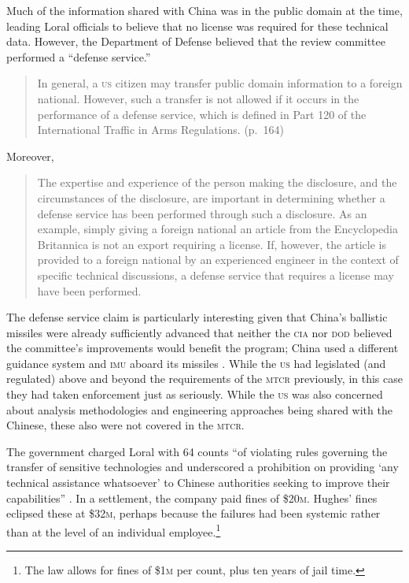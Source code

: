 \documentclass[preprint,twocolumn,5p]{elsarticle}
\begin{document}
Much of the information shared with China was in the public domain at the time, leading Loral officials to believe that no license was required for these technical data. However, the Department of Defense believed that the review committee performed a ``defense service.''
\begin{quote}
In general, a \textsc{us} citizen may transfer public domain information to a foreign national. However, such a transfer is not allowed if it occurs in the performance of a defense service, which is defined in Part 120 of the International Traffic in Arms Regulations. (p.~164)
\end{quote}
Moreover,
\begin{quote}
The expertise and experience of the person making the disclosure, and the circumstances of the disclosure, are important in determining whether a defense service has been performed through such a disclosure. As an example, simply giving a foreign national an article from the Encyclopedia Britannica is not an export requiring a license. If, however, the article is provided to a foreign national by an experienced engineer in the context of specific technical discussions, a defense service that requires a license may have been performed. \cite{Cox1999}
\end{quote}

The defense service claim is particularly interesting given that China's ballistic missiles were already sufficiently advanced that neither the \textsc{cia} nor \textsc{dod} believed the committee's improvements would benefit the program; China used a different guidance system and \textsc{imu} aboard its missiles \citep{Cox1999}. While the \textsc{us} had legislated (and regulated) above and beyond the requirements of the \textsc{mtcr} previously, in this case they had taken enforcement just as seriously. While the \textsc{us} was also concerned about analysis methodologies and engineering approaches being shared with the Chinese, these also were not covered in the \textsc{mtcr}.

The government charged Loral with 64 counts ``of violating rules governing the transfer of sensitive technologies and underscored a prohibition on providing `any technical assistance whatsoever' to Chinese authorities seeking to improve their capabilities'' \citep{Marquis2002}. In a settlement, the company paid fines of \$20\textsc{m}. Hughes' fines eclipsed these at \$32\textsc{m}, perhaps because the failures had been systemic rather than at the level of an individual employee.\footnote{The law allows for fines of \$1\textsc{m} per count, plus ten years of jail time.}
\end{document}
